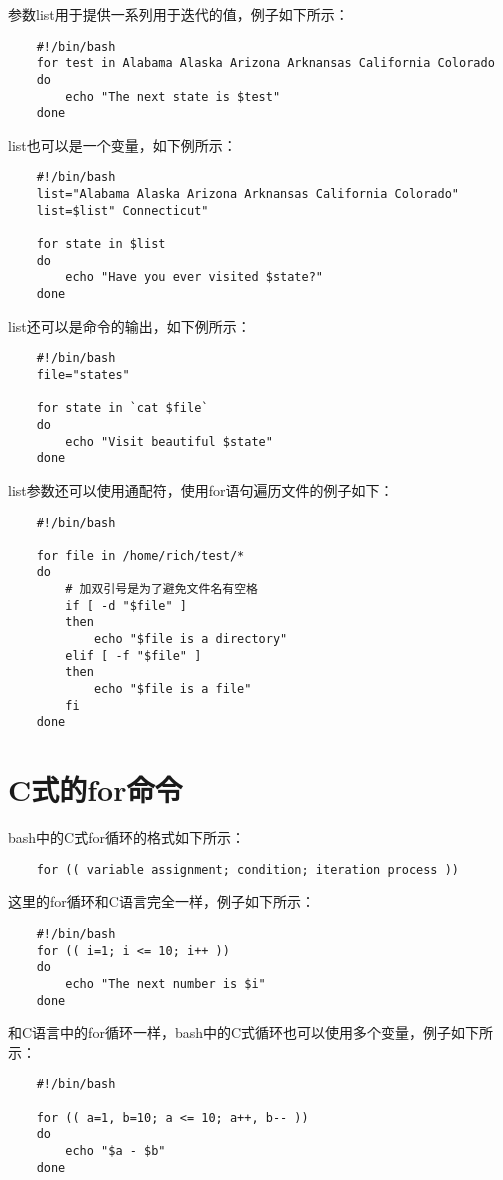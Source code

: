 \documentclass[a4paper,left=2.5cm,right=2.5cm,11pt]{article}
\begin{document}
	参数list用于提供一系列用于迭代的值，例子如下所示：
	\begin{lstlisting}
	#!/bin/bash
	for test in Alabama Alaska Arizona Arknansas California Colorado
	do
		echo "The next state is $test"
	done
	\end{lstlisting}

	list也可以是一个变量，如下例所示：
	\begin{lstlisting}
	#!/bin/bash
	list="Alabama Alaska Arizona Arknansas California Colorado"
	list=$list" Connecticut"

	for state in $list
	do
		echo "Have you ever visited $state?"
	done
	\end{lstlisting}

	list还可以是命令的输出，如下例所示：
	\begin{lstlisting}
	#!/bin/bash
	file="states"

	for state in `cat $file`
	do
		echo "Visit beautiful $state"
	done
	\end{lstlisting}

	list参数还可以使用通配符，使用for语句遍历文件的例子如下：
	\begin{lstlisting}
	#!/bin/bash

	for file in /home/rich/test/*
	do
		# 加双引号是为了避免文件名有空格
		if [ -d "$file" ]
		then
			echo "$file is a directory"
		elif [ -f "$file" ]
		then
			echo "$file is a file"
		fi
	done
	\end{lstlisting}

\section{C式的for命令}
	bash中的C式for循环的格式如下所示：
	\begin{lstlisting}
	for (( variable assignment; condition; iteration process ))
	\end{lstlisting}

	这里的for循环和C语言完全一样，例子如下所示：
	\begin{lstlisting}
	#!/bin/bash
	for (( i=1; i <= 10; i++ ))
	do
		echo "The next number is $i"
	done
	\end{lstlisting}

	和C语言中的for循环一样，bash中的C式循环也可以使用多个变量，例子如下所示：
	\begin{lstlisting}
	#!/bin/bash

	for (( a=1, b=10; a <= 10; a++, b-- ))
	do
		echo "$a - $b"
	done
	\end{lstlisting}
\end{document}

